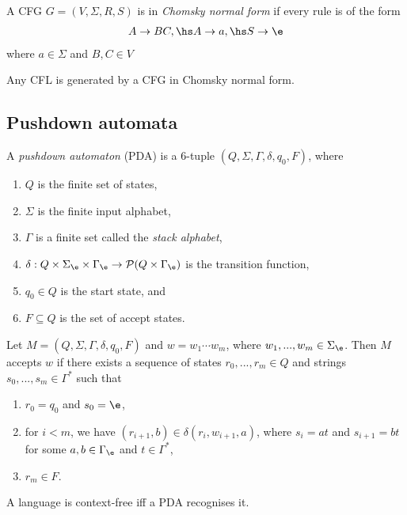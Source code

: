 \documentclass{article}
\begin{document}
\begin{definition*}
	A CFG $G=(V,\Sigma,R,S)$ is in \emph{Chomsky normal form} if every rule is of the
	form
	\begin{align*}
		A\to BC, \hs
		A\to a, \hs
		S\to\e
	\end{align*}
	where $a\in\Sigma$ and $B,C\in V$
\end{definition*}

\begin{theorem*}[Sipser p. 109]
	Any CFL is generated by a CFG in Chomsky normal form.
\end{theorem*}

\subsection{Pushdown automata}

\begin{definition*}
	A \emph{pushdown automaton} (PDA) is a 6-tuple $(Q,\Sigma,\Gamma,\delta,q_0,F)$,
	where
	\begin{enumerate}
		\item $Q$ is the finite set of states,
		\item $\Sigma$ is the finite input alphabet,
		\item $\Gamma$ is a finite set called the \emph{stack alphabet},
		\item $\delta:Q\times \Sigma_\e\times\Gamma_\e\to\mathcal{P}(Q\times\Gamma_\e)$ is the transition function,
		\item $q_0\in Q$ is the start state, and
		\item $F\subseteq Q$ is the set of accept states.
	\end{enumerate}
	Let $M=(Q,\Sigma,\Gamma,\delta,q_0,F)$ and $w=w_1\cdots w_m$, where
	$w_1,...,w_m\in\Sigma_\e$. Then $M$ accepts $w$ if there exists a sequence of
	states $r_0,...,r_m\in Q$ and strings $s_0,...,s_m\in\Gamma^*$ such that
	\begin{enumerate}
		\item $r_0=q_0$ and $s_0=\e$,
		\item for $i<m$, we have $(r_{i+1},b)\in\delta(r_i,w_{i+1},a)$, where $s_i=at$
		      and $s_{i+1}=bt$ for some $a,b\in\Gamma_\e$ and $t\in\Gamma^*$,
		\item $r_m\in F$.
	\end{enumerate}
\end{definition*}

\begin{theorem*}[Sipser p. 117]
	A language is context-free iff a PDA recognises it.
\end{theorem*}
\end{document}
